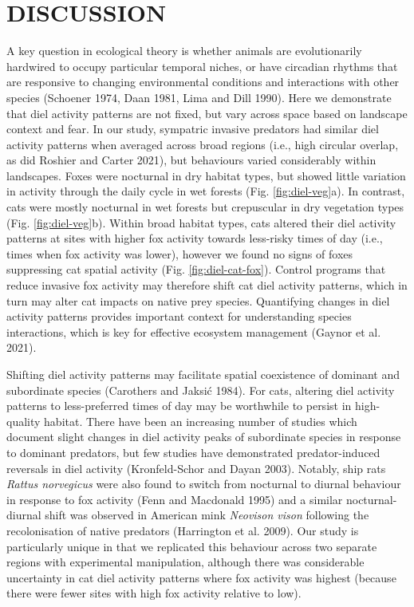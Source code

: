 \documentclass[preprint, 3p, authoryear]{elsarticle} %
\begin{document}
\newpage

\hypertarget{discussion}{%
\section{DISCUSSION}\label{discussion}}

A key question in ecological theory is whether animals are evolutionarily hardwired to occupy particular temporal niches, or have circadian rhythms that are responsive to changing environmental conditions and interactions with other species (Schoener 1974, Daan 1981, Lima and Dill 1990). Here we demonstrate that diel activity patterns are not fixed, but vary across space based on landscape context and fear. In our study, sympatric invasive predators had similar diel activity patterns when averaged across broad regions (i.e., high circular overlap, as did Roshier and Carter 2021), but behaviours varied considerably within landscapes. Foxes were nocturnal in dry habitat types, but showed little variation in activity through the daily cycle in wet forests (Fig. \ref{fig:diel-veg}a). In contrast, cats were mostly nocturnal in wet forests but crepuscular in dry vegetation types (Fig. \ref{fig:diel-veg}b). Within broad habitat types, cats altered their diel activity patterns at sites with higher fox activity towards less-risky times of day (i.e., times when fox activity was lower), however we found no signs of foxes suppressing cat spatial activity (Fig. \ref{fig:diel-cat-fox}). Control programs that reduce invasive fox activity may therefore shift cat diel activity patterns, which in turn may alter cat impacts on native prey species. Quantifying changes in diel activity patterns provides important context for understanding species interactions, which is key for effective ecosystem management (Gaynor et al. 2021).

Shifting diel activity patterns may facilitate spatial coexistence of dominant and subordinate species (Carothers and Jaksić 1984). For cats, altering diel activity patterns to less-preferred times of day may be worthwhile to persist in high-quality habitat. There have been an increasing number of studies which document slight changes in diel activity peaks of subordinate species in response to dominant predators, but few studies have demonstrated predator-induced reversals in diel activity (Kronfeld-Schor and Dayan 2003). Notably, ship rats \emph{Rattus norvegicus} were also found to switch from nocturnal to diurnal behaviour in response to fox activity (Fenn and Macdonald 1995) and a similar nocturnal-diurnal shift was observed in American mink \emph{Neovison vison} following the recolonisation of native predators (Harrington et al. 2009). Our study is particularly unique in that we replicated this behaviour across two separate regions with experimental manipulation, although there was considerable uncertainty in cat diel activity patterns where fox activity was highest (because there were fewer sites with high fox activity relative to low).
\end{document}
